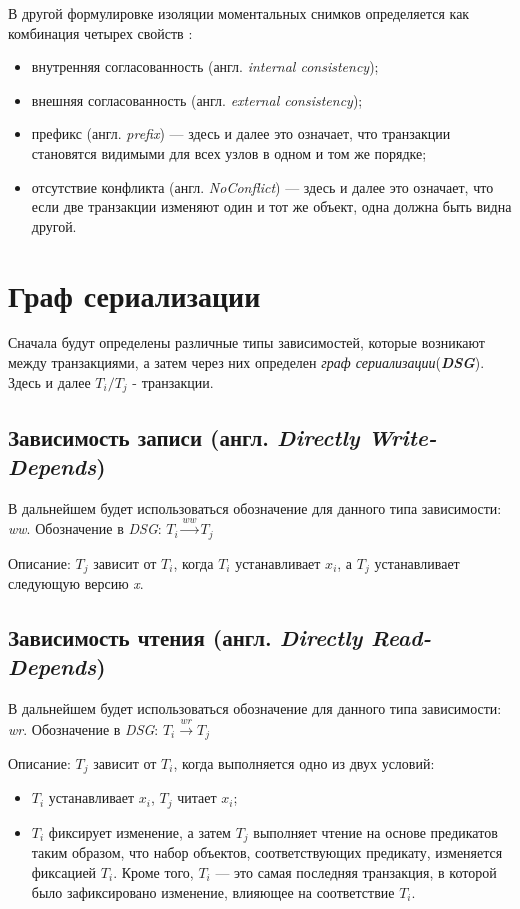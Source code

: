 \documentclass[14pt,  openany]{book}
\begin{document}
\par
В другой формулировке изоляции моментальных снимков определяется как комбинация четырех свойств \cite{cerone_et_al}:
\begin{itemize}
\item внутренняя согласованность (англ. \textit{internal consistency});
\item внешняя согласованность (англ. \textit{external consistency});
\item префикс (англ. \textit{prefix}) --- здесь и далее это означает, что транзакции становятся видимыми для всех узлов в одном и том же порядке;
\item отсутствие конфликта (англ. \textit{NoConflict}) --- здесь и далее это означает, что если две транзакции изменяют один и тот же объект, одна должна быть видна другой.
\end{itemize}

\section{Граф сериализации \cite{IsolationLevelDefinitions} \cite{IsolationLevelDefinitions2}}
Сначала будут определены различные типы зависимостей, которые возникают между транзакциями, а затем через них определен \textit{граф сериализации}(\textit{\textbf{DSG}}). 
Здесь и далее $T_i/T_j$ - транзакции.
\subsection{Зависимость записи (англ. \textit{Directly Write-Depends})}
В дальнейшем будет использоваться обозначение для данного типа зависимости: \textit{ww}. Обозначение в \textit{DSG}: $T_i  \xrightarrow{\textit{ww}} T_j$
\par
Описание: $T_j$ зависит от $T_i$, когда $T_i$ устанавливает $x_i$, а $T_j$ устанавливает следующую версию \textit{x}.

\subsection{Зависимость чтения (англ. \textit{Directly Read-Depends})}
В дальнейшем будет использоваться обозначение для данного типа зависимости: \textit{wr}. Обозначение в \textit{DSG}: $T_i  \xrightarrow{\textit{wr}} T_j$
\par
Описание: $T_j$ зависит от $T_i$,  когда выполняется одно из двух условий:
\begin{itemize}
\item $T_i$ устанавливает $x_i$, $T_j$ читает $x_i$;
\item $T_i$ фиксирует изменение, а затем $T_j$ выполняет чтение на основе предикатов таким образом, что набор объектов, соответствующих предикату, изменяется фиксацией $T_i$.   Кроме того, $T_i$ --- это самая последняя транзакция, в которой было зафиксировано изменение, влияющее на соответствие $T_i$.
\end{itemize}
\end{document}
